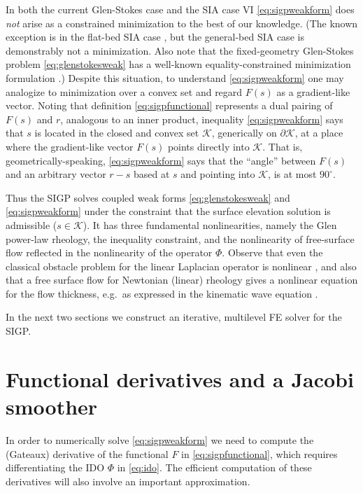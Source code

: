 \documentclass[letterpaper,final,12pt,reqno]{amsart}
\theoremstyle{claim}
\numberwithin{equation}{section}
\numberwithin{figure}{section}
\numberwithin{table}{section}
\numberwithin{theorem}{section}
\begin{document}
In both the current Glen-Stokes case and the SIA case VI \eqref{eq:sigpweakform} does \emph{not} arise as a constrained minimization to the best of our knowledge.  (The known exception is in the flat-bed SIA case \cite{JouvetBueler2012}, but the general-bed SIA case is demonstrably not a minimization.  Also note that the fixed-geometry Glen-Stokes problem \eqref{eq:glenstokesweak} has a well-known equality-constrained minimization formulation \cite{Elmanetal2014,JouvetRappaz2011}.)  Despite this situation, to understand \eqref{eq:sigpweakform} one may analogize to minimization over a convex set and regard $F(s)$ as a gradient-like vector.  Noting that definition \eqref{eq:sigpfunctional} represents a dual pairing of $F(s)$ and $r$, analogous to an inner product, inequality \eqref{eq:sigpweakform} says that $s$ is located in the closed and convex set $\mathcal{K}$, generically on $\partial\mathcal{K}$, at a place where the gradient-like vector $F(s)$ points directly into $\mathcal{K}$.  That is, geometrically-speaking, \eqref{eq:sigpweakform} says that the ``angle'' between $F(s)$ and an arbitrary vector $r-s$ based at $s$ and pointing into $\mathcal{K}$, is at most $90^\circ$.

Thus the SIGP solves coupled weak forms \eqref{eq:glenstokesweak} and \eqref{eq:sigpweakform} under the constraint that the surface elevation solution is admissible ($s \in \mathcal{K}$).  It has three fundamental nonlinearities, namely the Glen power-law rheology, the inequality constraint, and the nonlinearity of free-surface flow reflected in the nonlinearity of the operator $\Phi$.  Observe that even the classical obstacle problem for the linear Laplacian operator is nonlinear \cite{KinderlehrerStampacchia1980}, and also that a free surface flow for Newtonian (linear) rheology gives a nonlinear equation for the flow thickness, e.g.~as expressed in the kinematic wave equation \cite{Ockendonetal2003}.

In the next two sections we construct an iterative, multilevel FE solver for the SIGP.


\section{Functional derivatives and a Jacobi smoother} \label{sec:deriv}

In order to numerically solve \eqref{eq:sigpweakform} we need to compute the (Gateaux) derivative of the functional $F$ in \eqref{eq:sigpfunctional}, which requires differentiating the IDO $\Phi$ in \eqref{eq:ido}.  The efficient computation of these derivatives will also involve an important approximation.
\end{document}
